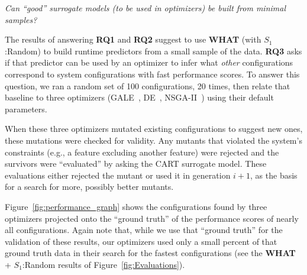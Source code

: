 \documentclass{newsig}
\newcommand{\fig}[1]{Figure~\ref{fig:#1}}
\newcommand{\what}{{\bf WHAT }}
\begin{document}
\begin{center}
{\em
Can ``good'' surrogate models (to be used in optimizers)
be built from minimal samples?}
\end{center}

The results of answering {\bf RQ1} and {\bf RQ2} suggest to use \what (with $S_1$:Random) to build runtime predictors from a small sample of the data. {\bf RQ3}
asks if that predictor can be used by an optimizer to infer what {\em other} configurations correspond to system configurations with fast performance scores.
To answer this question,  we ran  a random set of 100 
configurations, 20 times, then relate that baseline to three optimizers (GALE~\cite{krall2014gale}, DE~\cite{storn1997differential}, NSGA-II~\cite{deb00afast}) using their
default parameters.
 
When these three optimizers mutated existing configurations to suggest new ones,
these mutations were checked for validity. Any mutants that violated the system's constraints (e.g., a feature excluding another feature) were rejected
and the survivors were ``evaluated'' by asking the CART surrogate model.
These evaluations either rejected the mutant or used it in generation $i+1$, as the basis for a search for more, possibly
better  mutants.




\fig{performance_graph} shows the configurations found by three optimizers projected onto the ``ground truth'' of the performance scores of nearly
all configurations. Again note that, while we use that ``ground truth'' for the validation of these results, our optimizers 
used only a small percent of that ground truth data in their search for the fastest configurations (see the \what + $S_1$:Random
results of \fig{Evaluations}).
\end{document}
